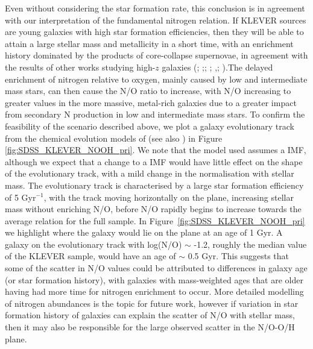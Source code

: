 \documentclass[usenatbib]{mnras} %
\begin{document}
Even without considering the star formation rate, this conclusion is in agreement with our interpretation of the fundamental nitrogen relation. If KLEVER sources are young galaxies with high star formation efficiencies, then they will be able to attain a large stellar mass and metallicity in a short time, with an enrichment history dominated by the products of core-collapse supernovae, in agreement with the results of other works studying high-$z$ galaxies (\citealt{Steidel_2016}; \citealt{Strom_2018};\citealt{Shapley_2019}; \citealt{Sanders_2020OH};  \citealt{Topping_2020},\citeyear{Topping_2020b}; \citealt{Cullen_2021}).The delayed enrichment of nitrogen relative to oxygen, mainly caused by low and intermediate mass stars, can then cause the N/O ratio to increase, with N/O increasing to greater values in the more massive, metal-rich galaxies due to a greater impact from secondary N production in low and intermediate mass stars. To confirm the feasibility of the scenario described above, we plot a galaxy evolutionary track from the chemical evolution models of \cite{Vincenzo_2016} (see also \citealt{Magrini_2018}) in Figure \ref{fig:SDSS_KLEVER_NOOH_pri}. We note that the model used assumes a \cite{Salpeter_1995} IMF, although we expect that a change to a \cite{Chabrier_2003} IMF would have little effect on the shape of the evolutionary track, with a mild change in the normalisation with stellar mass. The evolutionary track is characterised by a large star formation efficiency of 5 Gyr$^{-1}$, with the track moving horizontally on the plane, increasing stellar mass without enriching N/O, before N/O rapidly begins to increase towards the average relation for the full sample. In Figure~\ref{fig:SDSS_KLEVER_NOOH_pri} we highlight where the galaxy would lie on the plane at an age of 1 Gyr. A galaxy on the evolutionary track with log(N/O) $\sim$ -1.2, roughly the median value of the KLEVER sample, would have an age of $\sim$ 0.5 Gyr. This suggests that some of the scatter in N/O values could be attributed to differences in galaxy age (or star formation history), with galaxies with mass-weighted ages that are older having had more time for nitrogen enrichment to occur. More detailed modelling of nitrogen abundances is the topic for future work, however if variation in star formation history of galaxies can explain the scatter of N/O with stellar mass, then it may also be responsible for the large observed scatter in the N/O-O/H plane. 
\end{document}
